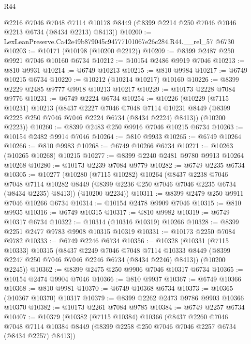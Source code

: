 \begin{lexlean}{R44}
\begin{coremodule}
{      @2216
      @7046
      @7048
      @7114
      @10178
      @8449
      (@8399 @2214 @250 @7046 @7046 @2213 @6734 (@8434 @2213) @8413))
@10200 := LexLeanPreserve.Ca42e49b879045c94777101067e26c284.R44.__rel_57 @6730
@10203 := @10171 (@10198 (@10200 @2212))
@10209 := @8399 @2487 @250 @9921 @7046 @10160 @6734
@10212 := @10154 @2486 @9919 @7046
@10213 := @810 @9931
@10214 := @6749 @10213
@10215 := @810 @9984
@10217 := @6749 @10215 @6734
@10220 := @10212 (@10214 @10217) @10160
@10226 := @8399 @2229 @2485 @9777 @9918 @10213 @10217
@10229 := @10173 @2228 @7084 @9776
@10231 := @6749 @2224 @6734
@10254 := @10226
    (@10229
      (@7115 @10231)
      @10213
      (@8437
        @2227
        @7046
        @7048
        @7114
        @10231
        @8449
        (@8399 @2225 @250 @7046 @7046 @2224 @6734 (@8434 @2224) @8413))
      (@10200 @2223))
@10260 := @8399 @2483 @250 @9916 @7046 @10215 @6734
@10263 := @10154 @2482 @9914 @7046
@10264 := @810 @9933
@10265 := @6749 @10264
@10266 := @810 @9983
@10268 := @6749 @10266 @6734
@10271 := @10263 (@10265 @10268) @10215
@10277 := @8399 @2240 @2481 @9780 @9913 @10264 @10268
@10280 := @10173 @2239 @7084 @9779
@10282 := @6749 @2235 @6734
@10305 := @10277
    (@10280
      (@7115 @10282)
      @10264
      (@8437
        @2238
        @7046
        @7048
        @7114
        @10282
        @8449
        (@8399 @2236 @250 @7046 @7046 @2235 @6734 (@8434 @2235) @8413))
      (@10200 @2234))
@10311 := @8399 @2479 @250 @9911 @7046 @10266 @6734
@10314 := @10154 @2478 @9909 @7046
@10315 := @810 @9935
@10316 := @6749 @10315
@10317 := @810 @9982
@10319 := @6749 @10317 @6734
@10322 := @10314 (@10316 @10319) @10266
@10328 := @8399 @2251 @2477 @9783 @9908 @10315 @10319
@10331 := @10173 @2250 @7084 @9782
@10333 := @6749 @2246 @6734
@10356 := @10328
    (@10331
      (@7115 @10333)
      @10315
      (@8437
        @2249
        @7046
        @7048
        @7114
        @10333
        @8449
        (@8399 @2247 @250 @7046 @7046 @2246 @6734 (@8434 @2246) @8413))
      (@10200 @2245))
@10362 := @8399 @2475 @250 @9906 @7046 @10317 @6734
@10365 := @10154 @2474 @9904 @7046
@10366 := @810 @9937
@10367 := @6749 @10366
@10368 := @810 @9981
@10370 := @6749 @10368 @6734
@10373 := @10365 (@10367 @10370) @10317
@10379 := @8399 @2262 @2473 @9786 @9903 @10366 @10370
@10382 := @10173 @2261 @7084 @9785
@10384 := @6749 @2257 @6734
@10407 := @10379
    (@10382
      (@7115 @10384)
      @10366
      (@8437
        @2260
        @7046
        @7048
        @7114
        @10384
        @8449
        (@8399 @2258 @250 @7046 @7046 @2257 @6734 (@8434 @2257) @8413))
}
\end{coremodule}
\end{lexlean}
